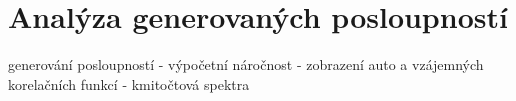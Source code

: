 \section{Analýza generovaných posloupností}

generování posloupností - výpočetní náročnost - zobrazení auto a vzájemných korelačních funkcí - kmitočtová spektra
